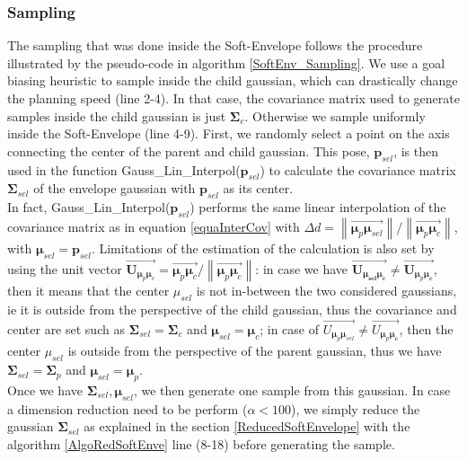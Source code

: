 \documentclass[letterpaper, 10 pt, conference]{ieeeconf}  %
\newcommand{\mb}[1]{{\boldsymbol{#1}}}
\newcommand\norm[1]{\left\lVert#1\right\rVert}
\begin{document}
\subsubsection{Sampling}\leavevmode\par \label{samplingSection}
The sampling that was done inside the Soft-Envelope follows the procedure illustrated by the pseudo-code in algorithm \ref{SoftEnv_Sampling}.
We use a goal biasing heuristic to sample inside the child gaussian, which can drastically change the planning speed (line 2-4). In that case, the covariance matrix used to generate samples inside the child gaussian is just $\mb{\Sigma}_c$. Otherwise we sample uniformly inside the Soft-Envelope (line 4-9).  First, we randomly select a point on the axis connecting the center of the parent and child gaussian. This pose, $\mb{p}_{sel}$, is then used in the function {\selectfont Gauss\_Lin\_Interpol($\mb{p}_{sel}$)} to calculate the covariance matrix $\mb{\Sigma}_{sel}$  of the envelope gaussian with $\mb{p}_{sel}$ as its center.\\
In fact, {\selectfont Gauss\_Lin\_Interpol($\mb{p}_{sel}$)} performs the same linear interpolation of the covariance matrix as in equation \ref{equaInterCov} with $\Delta d = \norm{\overrightarrow{\mb{\mu}_p\mb{\mu}_{sel}}}/{\norm{\overrightarrow{\mb{\mu}_p\mb{\mu}_c}}}$, with $\mb{\mu}_{sel} = \mb{p}_{sel}$. Limitations of the estimation of the calculation is also set by using the unit vector $\overrightarrow{\mb{U}_{\mb{\mu}_p\mb{\mu}_{c}}} = \overrightarrow{\mb{\mu}_p\mb{\mu}_{c}}/\norm{\overrightarrow{\mb{\mu}_p\mb{\mu}_{c}}}$: in case we have $\overrightarrow{\mb{U}_{\mb{\mu_{sel}}\mb{\mu_{c}}}} \neq \overrightarrow{\mb{U}_{\mb{\mu}_p\mb{\mu_{c}}}} $, then it means that the center $\mu_{sel}$ is not in-between the two considered gaussians, ie it is outside from the perspective of the child gaussian, thus the covariance and center are set such as $\mb{\Sigma}_{sel}=\mb{\Sigma}_c$ and $\mb{\mu}_{sel}=\mb{\mu}_c$; in case of $\overrightarrow{U_{\mb{\mu}_{p}\mb{\mu}_{sel}}} \neq \overrightarrow{U_{\mb{\mu}_p\mb{\mu_{c}}}} $, then the center $\mu_{sel}$ is outside from the perspective of the parent gaussian, thus we have $\mb{\Sigma}_{sel}=\mb{\Sigma}_p$ and $\mb{\mu}_{sel}=\mb{\mu}_p$.\\
Once we have $\mb{\Sigma}_{sel}, \mb{\mu}_{sel}$, we then generate one sample from this gaussian. In case a dimension reduction need to be perform ($\alpha<100$), we simply reduce the gaussian $\mb{\Sigma}_{sel}$ as explained in the section \ref{ReducedSoftEnvelope} with the algorithm \ref{AlgoRedSoftEnve} line (8-18) before generating the sample. 
\\
\end{document}
